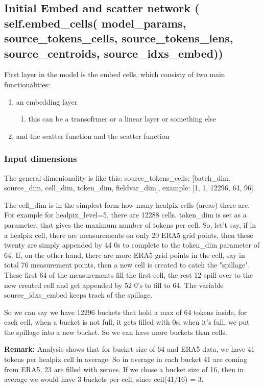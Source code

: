 \documentclass{article}
\begin{document}
\subsection{Initial Embed and scatter network ( self.embed\_cells( model\_params, source\_tokens\_cells, source\_tokens\_lens, source\_centroids, source\_idxs\_embed))}

First layer in the model is the embed cells, which consisty of two main functionalities:
\begin{enumerate}
    \item an embedding layer
    \begin{enumerate}
        \item this can be a transofrmer or a linear layer or something else
    \end{enumerate}
    \item and the scatter function
and the scatter function
\end{enumerate}

\subsubsection{Input dimensions}
The general dimenionality is like this: source\_tokens\_cells: [batch\_dim, source\_dim, cell\_dim, token\_dim, fieldvar\_dim], example: [1, 1, 12296, 64, 96].

The cell\_dim is in the simplest form how many healpix cells (areas) there are. For example for healpix\_level=5, there are 12288 cells. token\_dim is set as a parameter, that gives the maximum number of tokens per cell. So, let't say, if in a healpix cell, there are measurements on only 20 ERA5 grid points, then these twenty are simply appended by 44 0s to complete to the token\_dim parameter of 64. If, on the other hand, there are more ERA5 grid points in the cell, say in total 76 measurement points, then a new cell is created to catch the "spillage". These first 64 of the measurements fill the first cell, the rest 12 spill over to the new created cell and get appended by 52 0's to fill to 64. The variable source\_idxs\_embed keeps track of the spillage.

So we can say we have 12296 buckets that hold a max of 64 tokens inside, for each cell, when a bucket is not full, it gets filled with 0s; when it's full, we put the spillage into a new bucket. So we can have more buckets than cells.

\textbf{Remark:} Analysis shows that for bucket size of 64 and ERA5 data, we have 41 tokens per healpix cell in average. So in average in each bucket 41 are coming from ERA5, 23 are filled with zeroes. If we chose a bucket size of 16, then in average we would have 3 buckets per cell, since ceil(41/16) = 3.
\end{document}
